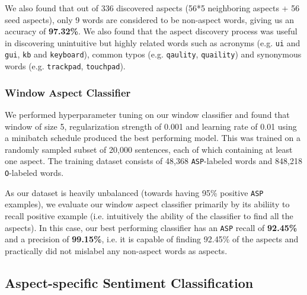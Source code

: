 \documentclass{article} %
\begin{document}
We also found that out of 336 discovered aspects (56*5 neighboring aspects + 56 seed aspects), only 9 words are considered to be non-aspect words, giving us an accuracy of \textbf{97.32\%}. We also found that the aspect discovery process was useful in discovering unintuitive but highly related words such as acronyms (e.g. \texttt{ui} and \texttt{gui}, \texttt{kb} and \texttt{keyboard}), common typos (e.g. \texttt{qaulity}, \texttt{quaility}) and synonymous words (e.g. \texttt{trackpad}, \texttt{touchpad}).

\subsubsection{Window Aspect Classifier}
We performed hyperparameter tuning on our window classifier and found that window of size 5, regularization strength of 0.001 and learning rate of 0.01 using a minibatch schedule produced the best performing model. This was trained on a randomly sampled subset of 20,000 sentences, each of which containing at least one aspect. The training dataset consists of 48,368 \texttt{ASP}-labeled words and 848,218 \texttt{O}-labeled words. 

As our dataset is heavily unbalanced (towards having 95\% positive \texttt{ASP} examples), we evaluate our window aspect classifier primarily by its abiliity to recall positive example (i.e. intuitively the ability of the classifier to find all the aspects). In this case, our best performing classifier has an \texttt{ASP} recall of \textbf{92.45\%} and a precision of \textbf{99.15\%}, i.e. it is capable of finding 92.45\% of the aspects and practically did not mislabel any non-aspect words as aspects.

\subsection{Aspect-specific Sentiment Classification}
\end{document}
